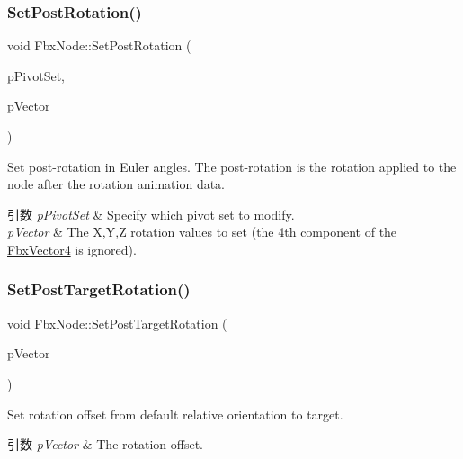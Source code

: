 \subsubsection{\texorpdfstring{Set\+Post\+Rotation()}{SetPostRotation()}}
{\footnotesize\ttfamily void Fbx\+Node\+::\+Set\+Post\+Rotation (\begin{DoxyParamCaption}\item[{\hyperlink{class_fbx_node_ae62b7311ac4727654cdf1ebd5cbf7343}{E\+Pivot\+Set}}]{p\+Pivot\+Set,  }\item[{\hyperlink{class_fbx_vector4}{Fbx\+Vector4}}]{p\+Vector }\end{DoxyParamCaption})}

Set post-\/rotation in Euler angles. The post-\/rotation is the rotation applied to the node after the rotation animation data. 
\begin{DoxyParams}{引数}
{\em p\+Pivot\+Set} & Specify which pivot set to modify. \\
\hline
{\em p\+Vector} & The X,Y,Z rotation values to set (the 4th component of the \hyperlink{class_fbx_vector4}{Fbx\+Vector4} is ignored). \\
\hline
\end{DoxyParams}
\mbox{\label{class_fbx_node_a6c21a98a97d564dc49e09086abccecd5}} 
\subsubsection{\texorpdfstring{Set\+Post\+Target\+Rotation()}{SetPostTargetRotation()}}
{\footnotesize\ttfamily void Fbx\+Node\+::\+Set\+Post\+Target\+Rotation (\begin{DoxyParamCaption}\item[{\hyperlink{class_fbx_vector4}{Fbx\+Vector4}}]{p\+Vector }\end{DoxyParamCaption})}

Set rotation offset from default relative orientation to target. 
\begin{DoxyParams}{引数}
{\em p\+Vector} & The rotation offset. \\
\hline
\end{DoxyParams}
\mbox{\label{class_fbx_node_ab818f1d02667c73d9610acc1ea4a7426}} 
